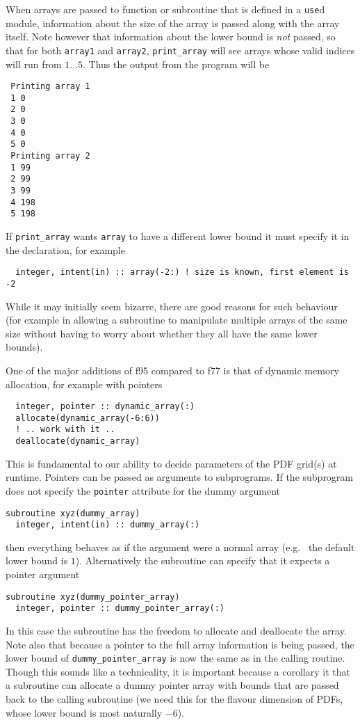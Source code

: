 \documentclass[12pt]{article}
\newcommand{\eg}{e.g.\ }
\begin{document}
When arrays are passed to function or subroutine that is defined in a
\texttt{use}d module, information about the size of the array is
passed along with the array itself. Note however that information
about the lower bound is \emph{not} passed, so that for both
\texttt{array1} and \texttt{array2}, \texttt{print\_array} will see
arrays whose valid indices will run from $1\ldots5$. Thus the output
from the program will be
\begin{verbatim}
 Printing array 1
 1 0
 2 0
 3 0
 4 0
 5 0
 Printing array 2
 1 99
 2 99
 3 99
 4 198
 5 198
\end{verbatim}
If \texttt{print\_array} wants \texttt{array} to have a different lower
bound it must specify it in the declaration, for example
\begin{verbatim}
  integer, intent(in) :: array(-2:) ! size is known, first element is -2
\end{verbatim}
While it may initially seem bizarre, there are good reasons for such
behaviour (for example in allowing a subroutine to manipulate multiple
arrays of the same size without having to worry about whether they all
have the same lower bounds).

One of the major additions of f95 compared to f77 is that of dynamic
memory allocation, for example with pointers
\begin{verbatim}
  integer, pointer :: dynamic_array(:)
  allocate(dynamic_array(-6:6))
  ! .. work with it ..
  deallocate(dynamic_array)
\end{verbatim}
This is fundamental to our ability to decide parameters of the PDF
grid(s) at runtime. Pointers can be passed as arguments to subprograms.
If the subprogram does not specify the \texttt{pointer} attribute for
the dummy argument
\begin{verbatim}
subroutine xyz(dummy_array)
  integer, intent(in) :: dummy_array(:)
\end{verbatim}
then everything behaves as if the argument were a normal array (\eg
the default lower bound is $1$). Alternatively the subroutine can
specify that it expects a pointer argument
\begin{verbatim}
subroutine xyz(dummy_pointer_array)
  integer, pointer :: dummy_pointer_array(:)
\end{verbatim}
In this case the subroutine has the freedom to allocate and deallocate
the array. Note also that because a pointer to the full array
information is being passed, the lower bound of \texttt{dummy\_pointer\_array}
is now the same as in the calling routine. Though this sounds like a
technicality, it is important because a corollary it that a subroutine
can allocate a dummy pointer array with bounds that are passed back to
the calling subroutine (we need this for the flavour dimension of
PDFs, whose lower bound is most naturally $-6$).
\end{document}
